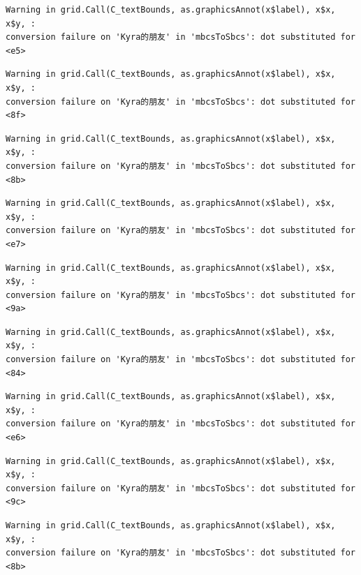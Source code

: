 \documentclass[
  letterpaper,
  DIV=11,
  numbers=noendperiod]{scrreprt}
\begin{document}
\begin{verbatim}
Warning in grid.Call(C_textBounds, as.graphicsAnnot(x$label), x$x, x$y, :
conversion failure on 'Kyra的朋友' in 'mbcsToSbcs': dot substituted for <e5>
\end{verbatim}

\begin{verbatim}
Warning in grid.Call(C_textBounds, as.graphicsAnnot(x$label), x$x, x$y, :
conversion failure on 'Kyra的朋友' in 'mbcsToSbcs': dot substituted for <8f>
\end{verbatim}

\begin{verbatim}
Warning in grid.Call(C_textBounds, as.graphicsAnnot(x$label), x$x, x$y, :
conversion failure on 'Kyra的朋友' in 'mbcsToSbcs': dot substituted for <8b>
\end{verbatim}

\begin{verbatim}
Warning in grid.Call(C_textBounds, as.graphicsAnnot(x$label), x$x, x$y, :
conversion failure on 'Kyra的朋友' in 'mbcsToSbcs': dot substituted for <e7>
\end{verbatim}

\begin{verbatim}
Warning in grid.Call(C_textBounds, as.graphicsAnnot(x$label), x$x, x$y, :
conversion failure on 'Kyra的朋友' in 'mbcsToSbcs': dot substituted for <9a>
\end{verbatim}

\begin{verbatim}
Warning in grid.Call(C_textBounds, as.graphicsAnnot(x$label), x$x, x$y, :
conversion failure on 'Kyra的朋友' in 'mbcsToSbcs': dot substituted for <84>
\end{verbatim}

\begin{verbatim}
Warning in grid.Call(C_textBounds, as.graphicsAnnot(x$label), x$x, x$y, :
conversion failure on 'Kyra的朋友' in 'mbcsToSbcs': dot substituted for <e6>
\end{verbatim}

\begin{verbatim}
Warning in grid.Call(C_textBounds, as.graphicsAnnot(x$label), x$x, x$y, :
conversion failure on 'Kyra的朋友' in 'mbcsToSbcs': dot substituted for <9c>
\end{verbatim}

\begin{verbatim}
Warning in grid.Call(C_textBounds, as.graphicsAnnot(x$label), x$x, x$y, :
conversion failure on 'Kyra的朋友' in 'mbcsToSbcs': dot substituted for <8b>
\end{verbatim}
\end{document}
